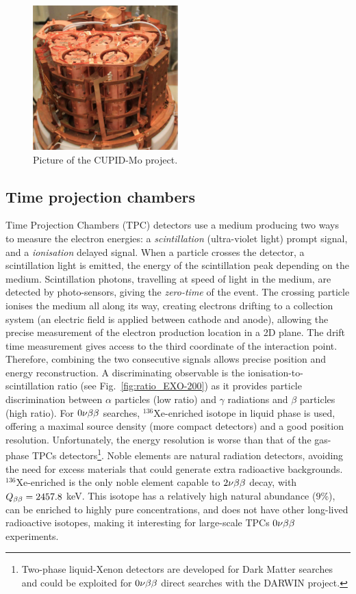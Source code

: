 \begin{figure}
  \centering
  \includegraphics[width=0.5\textwidth]{neutrinophysics/fig_neutrinophysics/CUPID-Mo.pdf}
  \caption{Picture of the CUPID-Mo project.
    \label{fig:CUPID-Mo}}
\end{figure}

\subsection{Time projection chambers}
\label{subsec:TPC}

Time Projection Chambers (TPC) detectors use a medium producing two ways to measure the electron energies: a \emph{scintillation} (ultra-violet light) prompt signal, and a \emph{ionisation} delayed signal.
When a particle crosses the detector, a scintillation light is emitted, the energy of the scintillation peak depending on the medium.
Scintillation photons, travelling at speed of light in the medium, are detected by photo-sensors, giving the \emph{zero-time} of the event.
The crossing particle ionises the medium all along its way, creating electrons drifting to a collection system (an electric field is applied between cathode and anode), allowing the precise measurement of the electron production location in a 2D plane.
The drift time measurement gives access to the third coordinate of the interaction point.
Therefore, combining the two consecutive signals allows precise position and energy reconstruction.
A discriminating observable is the ionisation-to-scintillation ratio (see Fig.~\ref{fig:ratio_EXO-200}) as it provides particle discrimination between $\alpha$ particles (low ratio) and $\gamma$ radiations and $\beta$ particles (high ratio).
For $0\nu\beta\beta$ searches, $^{136}$Xe-enriched isotope in liquid phase is used, offering a maximal source density (more compact detectors) and a good position resolution.
Unfortunately, the energy resolution is worse than that of the gas-phase TPCs detectors\footnote{Two-phase liquid-Xenon detectors are developed for Dark Matter searches and could be exploited for $0\nu\beta\beta$ direct searches with the DARWIN project.}.
Noble elements are natural radiation detectors, avoiding the need for excess materials that could generate extra radioactive backgrounds.
$^{136}$Xe-enriched is the only noble element capable to $2\nu\beta\beta$ decay, with $Q_{\beta\beta}=2457.8$ keV.
This isotope has a relatively high natural abundance ($9$\%), can be enriched to highly pure concentrations, and does not have other long-lived radioactive isotopes, making it interesting for large-scale TPCs $0\nu\beta\beta$ experiments.

